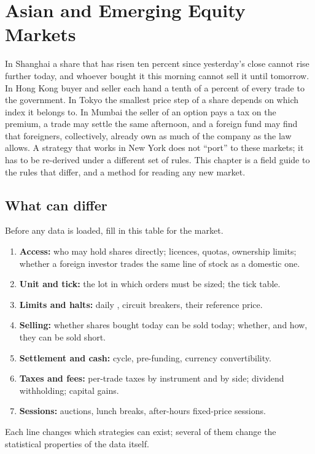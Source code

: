 \chapter{Asian and Emerging Equity Markets}\label{ch:m1:asian-and-emerging-equity-markets}

In Shanghai a share that has risen ten percent since yesterday's close
cannot rise further today, and whoever bought it this morning cannot sell it
until tomorrow. In Hong Kong buyer and seller each hand a tenth of a percent
of every trade to the government. In Tokyo the smallest price step of a share
depends on which index it belongs to. In Mumbai the seller of an option pays
a tax on the premium, a trade may settle the same afternoon, and a foreign
fund may find that foreigners, collectively, already own as much of the
company as the law allows. A strategy that works in New York does not
``port'' to these markets; it has to be re-derived under a different set of
rules. This chapter is a field guide to the rules that differ, and a method
for reading any new market.

\section{What can differ}

\begin{method}\label{met:m1:asian-and-emerging-equity-markets:checklist}
Before any data is loaded, fill in this table for the market.
\begin{enumerate}
\item \textbf{Access:} who may hold shares directly; licences, quotas,
  ownership limits; whether a foreign investor trades the same line of stock
  as a domestic one.
\item \textbf{Unit and tick:} the lot in which orders must be sized; the
  tick table.
\item \textbf{Limits and halts:} daily , circuit breakers, their
  reference price.
\item \textbf{Selling:} whether shares bought today can be sold today;
  whether, and how, they can be sold short.
\item \textbf{Settlement and cash:} cycle, pre-funding, currency
  convertibility.
\item \textbf{Taxes and fees:} per-trade taxes by instrument and by side;
  dividend withholding; capital gains.
\item \textbf{Sessions:} auctions, lunch breaks, after-hours fixed-price
  sessions.
\end{enumerate}
Each line changes which strategies can exist; several of them change the
statistical properties of the data itself.
\end{method}

